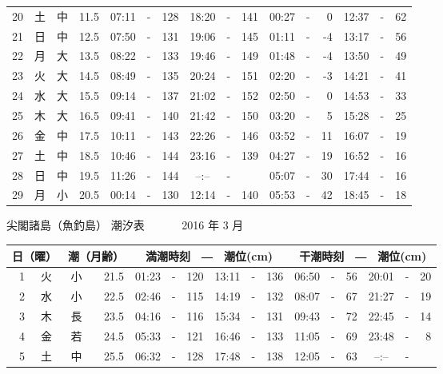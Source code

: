 \documentclass[12pt.a4j]{jsarticle}
\begin{document}
\begin{center}
\begin{table}[ht]
\begin{tabular}{|rc|cr|ccrccr|ccrccr|}
20 & 土 & 中 & 11.5 &  07:11 &-& 128  &  18:20 &-& 141  &   00:27 &-&   0  &   12:37 &-&  62  \\
21 & 日 & 中 & 12.5 &  07:50 &-& 131  &  19:06 &-& 145  &   01:11 &-&  -4  &   13:17 &-&  56  \\
22 & 月 & 大 & 13.5 &  08:22 &-& 133  &  19:46 &-& 149  &   01:48 &-&  -4  &   13:50 &-&  49  \\
23 & 火 & 大 & 14.5 &  08:49 &-& 135  &  20:24 &-& 151  &   02:20 &-&  -3  &   14:21 &-&  41  \\
24 & 水 & 大 & 15.5 &  09:14 &-& 137  &  21:02 &-& 152  &   02:50 &-&   0  &   14:53 &-&  33  \\
25 & 木 & 大 & 16.5 &  09:41 &-& 140  &  21:42 &-& 150  &   03:20 &-&   5  &   15:28 &-&  25  \\
26 & 金 & 中 & 17.5 &  10:11 &-& 143  &  22:26 &-& 146  &   03:52 &-&  11  &   16:07 &-&  19  \\
27 & 土 & 中 & 18.5 &  10:46 &-& 144  &  23:16 &-& 139  &   04:27 &-&  19  &   16:52 &-&  16  \\
28 & 日 & 中 & 19.5 &  11:26 &-& 144  &  --:-- &-&     &   05:07 &-&  30  &   17:44 &-&  16  \\
29 & 月 & 小 & 20.5 &  00:14 &-& 130  &  12:14 &-& 140  &   05:53 &-&  42  &   18:45 &-&  18  \\
   \hline
   \end{tabular}
\end{table}
\newpage
 {\LARGE 尖閣諸島（魚釣島）  潮汐表　　　}
 {\large 2016 年  3 月}\\
 \begin{table}[ht]
    \begin{tabular}{|rc|cr|ccrccr|ccrccr|}
    \hline
    \multicolumn{2}{|c|}{日（曜）} & \multicolumn{2}{c|}{潮（月齢）} & \multicolumn{6}{c|}{満潮時刻　―　潮位(cm)} & \multicolumn{6}{c|}{干潮時刻　―　潮位(cm)} \\
 \hline
 1 & 火 & 小 & 21.5 &  01:23 &-& 120  &  13:11 &-& 136  &   06:50 &-&  56  &   20:01 &-&  20  \\
 2 & 水 & 小 & 22.5 &  02:46 &-& 115  &  14:19 &-& 132  &   08:07 &-&  67  &   21:27 &-&  19  \\
 3 & 木 & 長 & 23.5 &  04:16 &-& 116  &  15:34 &-& 131  &   09:43 &-&  72  &   22:45 &-&  14  \\
 4 & 金 & 若 & 24.5 &  05:33 &-& 121  &  16:46 &-& 133  &   11:05 &-&  69  &   23:48 &-&   8  \\
 5 & 土 & 中 & 25.5 &  06:32 &-& 128  &  17:48 &-& 138  &   12:05 &-&  63  &   --:-- &-&     \\

\end{tabular}
\end{table}
\end{center}
\end{document}
